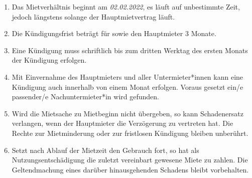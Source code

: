 \documentclass{scrreprt}[12pt,a4paper,twoside,duplex]
\newcommand{\mietBeginn}{02.02.2022}
\begin{document}
\begin{contract}
\label{clause:mietzeit}

\begin{enumerate}
  \item Das Mietverhältnis beginnt am
  \textsl{\mietBeginn}, es läuft auf unbestimmte Zeit, jedoch längstens solange der Hauptmietvertrag läuft.

  \item Die Kün\-di\-gungs\-frist beträgt für  sowie den Hauptmieter 3 Monate.

  \item Eine Kündigung muss schriftlich bis zum dritten Werktag des ersten Monats
  der Kündigung erfolgen.
  
  \item Mit Einvernahme des Hauptmieters und aller Untermieter*innen kann eine Kündigung auch innerhalb von einem Monat erfolgen. Voraus gesetzt ein/e passender/e Nachuntermieter*in wird gefunden.
  
  \item Wird die Mietsache zu Mietbeginn nicht übergeben, so kann  Schadenersatz verlangen, wenn der Hauptmieter die Verzögerung zu vertreten hat. Die Rechte  zur Mietminderung oder zur fristlosen Kündigung bleiben unberührt.

 \item Setzt  nach Ablauf der Mietzeit den Gebrauch fort, so hat  als Nutzungsentschädigung die zuletzt vereinbart gewesene Miete zu zahlen. Die Geltendmachung eines darüber hinausgehenden Schadens bleibt vorbehalten.
\end{enumerate}
\end{contract}
\end{document}
